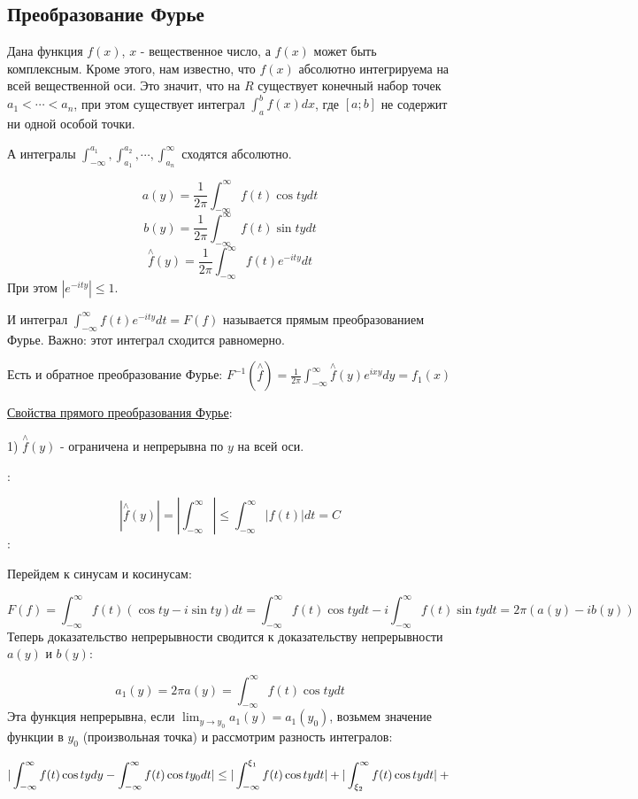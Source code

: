 \documentclass[12pt]{article}
\begin{document}
\subsection{Преобразование Фурье}
Дана функция $f(x)$, $x$ - вещественное число, а $f(x)$ может быть комплексным. Кроме этого, нам известно, что $f(x)$ абсолютно интегрируема на всей вещественной оси. Это значит, что на $R$ существует конечный набор точек $a_1 < \cdots < a_n$, при этом существует интеграл $\int_a^b f(x) dx$, где $[a;b]$ не содержит ни одной особой точки.\par
А интегралы $\int_{-\infty}^{a_1}, \int_{a_1}^{a_2}, \cdots, \int_{a_n}^{\infty}$ сходятся абсолютно.\par
$$a(y) = \frac{1}{2\pi} \int_{-\infty}^{\infty} f(t) \cos{ty}dt$$
$$b(y) = \frac{1}{2\pi} \int_{-\infty}^{\infty} f(t) \sin{ty}dt$$
$$\overset{\wedge}{f} (y) = \frac{1}{2\pi} \int_{-\infty}^{\infty} f(t) e^{-ity}dt$$
При этом $|e^{-ity}| \leq 1$.\par
И интеграл $\int_{-\infty}^{\infty} f(t) e^{-ity} dt = F(f)$ называется прямым преобразованием Фурье. Важно: этот интеграл сходится равномерно.\par
Есть и обратное преобразование Фурье: $F^{-1} (\overset{\wedge}{f}) = \frac{1}{2\pi} \int_{-\infty}^{\infty} \overset{\wedge}{f}(y) e^{ixy} dy = f_1(x)$\par
\uline{Свойства прямого преобразования Фурье}:\par
1) $\overset{\wedge}{f}(y)$ - ограничена и непрерывна по $y$ на всей оси.\par
{}:\par
$$|\overset{\wedge}{f}(y)| = |\int_{-\infty}^{\infty}| \leq \int_{-\infty}^{\infty} |f(t)| dt = C$$
:\par
Перейдем к синусам и косинусам:\par
$$F(f) = \int_{-\infty}^{\infty} f(t) (\cos{ty} - i\sin{ty})dt = \int_{-\infty}^{\infty} f(t) \cos{ty} dt - i \int_{-\infty}^{\infty} f(t) \sin{ty} dt = 2\pi (a(y) - i b(y))$$
Теперь доказательство непрерывности сводится к доказательству непрерывности $a(y)$ и $b(y)$:\par
$$a_1(y) = 2\pi a(y) = \int_{-\infty}^{\infty} f(t) \cos{ty} dt$$
Эта функция непрерывна, если $\lim_{y\to y_0} a_1(y) = a_1(y_0)$, возьмем значение функции в $y_0$ (произвольная точка) и рассмотрим разность интегралов:\par
$$|\int_{-\infty}^{\infty} f(t) \cos{ty} dy - \int_{-\infty}^{\infty} f(t) \cos{ty_0} dt| \leq | \int_{-\infty}^{\xi_1} f(t) \cos{ty} dt| + | \int_{\xi_2}^{\infty} f(t) \cos{ty} dt| +\\$$
\end{document}
